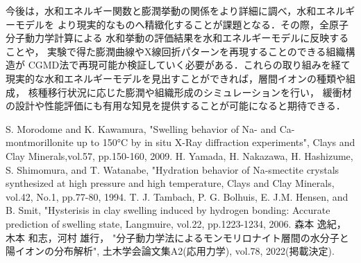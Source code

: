 ﻿\documentclass[11pt,a4j]{jarticle}
\begin{document}
今後は，水和エネルギー関数と膨潤挙動の関係をより詳細に調べ，水和エネルギーモデルを
より現実的なものへ精緻化することが課題となる．その際，全原子分子動力学計算による
水和挙動の評価結果を水和エネルギーモデルに反映することや，
実験で得た膨潤曲線やX線回折パターンを再現することのできる組織構造が
CGMD法で再現可能か検証していく必要がある．これらの取り組みを経て
現実的な水和エネルギーモデルを見出すことができれば，層間イオンの種類や組成，
核種移行状況に応じた膨潤や組織形成のシミュレーションを行い，
緩衝材の設計や性能評価にも有用な知見を提供することが可能になると期待できる．
%
\begin{thebibliography}{99}
	S. Morodome and K. Kawamura, 
	"Swelling behavior of Na- and Ca-montmorillonite up to 150°C by 
	in situ X-Ray diffraction experiments", 
	Clays and Clay Minerals,vol.57, pp.150-160, 2009.
	H. Yamada, H. Nakazawa, H. Hashizume, S. Shimomura, and T. Watanabe, 
	"Hydration behavior of Na-smectite crystals synthesized at high pressure 
	and high temperature, Clays and Clay Minerals, vol.42, No.1, pp.77-80, 1994.
	T. J. Tambach, P. G. Bolhuis, E. J.M. Hensen, and B. Smit, 
	"Hysterisis in clay swelling induced by hydrogen bonding: 
		Accurate prediction of swelling state, Langmuire, 
	vol.22, pp.1223-1234, 2006.
	森本 逸紀，木本 和志，河村 雄行，
	"分子動力学法によるモンモリロナイト層間の水分子と陽イオンの分布解析", 
		土木学会論文集A2(応用力学), vol.78, 2022(掲載決定). 	
\end{thebibliography}
\end{document}

